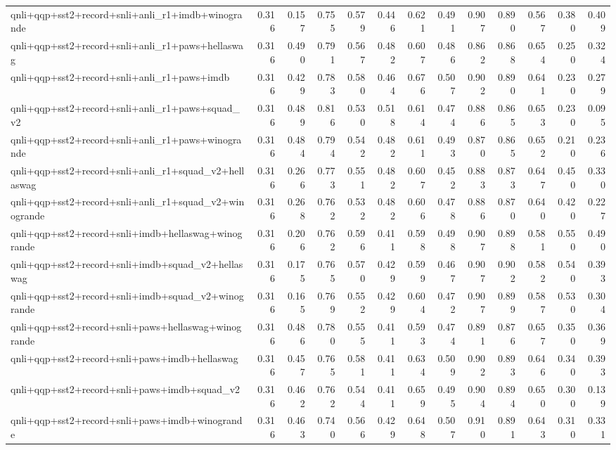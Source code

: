 \begin{table}[t]
\begin{tabular}{lrrrrrrrrrrrr}
    qnli+qqp+sst2+record+snli+anli\_r1+imdb+winogrande & 0.316 & 0.157 & 0.755 & 0.579 & 0.446 & 0.621 & 0.491 & 0.907 & 0.890 & 0.567 & 0.380 & 0.409 \\
    qnli+qqp+sst2+record+snli+anli\_r1+paws+hellaswag & 0.316 & 0.490 & 0.791 & 0.567 & 0.482 & 0.607 & 0.486 & 0.862 & 0.868 & 0.654 & 0.250 & 0.324 \\
    qnli+qqp+sst2+record+snli+anli\_r1+paws+imdb & 0.316 & 0.429 & 0.783 & 0.580 & 0.464 & 0.676 & 0.507 & 0.902 & 0.890 & 0.641 & 0.230 & 0.279 \\
    qnli+qqp+sst2+record+snli+anli\_r1+paws+squad\_v2 & 0.316 & 0.489 & 0.816 & 0.530 & 0.518 & 0.614 & 0.474 & 0.886 & 0.865 & 0.653 & 0.230 & 0.095 \\
    qnli+qqp+sst2+record+snli+anli\_r1+paws+winogrande & 0.316 & 0.484 & 0.794 & 0.542 & 0.482 & 0.611 & 0.493 & 0.870 & 0.865 & 0.652 & 0.210 & 0.236 \\
    qnli+qqp+sst2+record+snli+anli\_r1+squad\_v2+hellaswag & 0.316 & 0.266 & 0.773 & 0.551 & 0.482 & 0.607 & 0.452 & 0.883 & 0.873 & 0.647 & 0.450 & 0.330 \\
    qnli+qqp+sst2+record+snli+anli\_r1+squad\_v2+winogrande & 0.316 & 0.268 & 0.762 & 0.532 & 0.482 & 0.606 & 0.478 & 0.886 & 0.870 & 0.640 & 0.420 & 0.227 \\
    qnli+qqp+sst2+record+snli+imdb+hellaswag+winogrande & 0.316 & 0.206 & 0.762 & 0.596 & 0.411 & 0.598 & 0.498 & 0.907 & 0.898 & 0.581 & 0.550 & 0.490 \\
    qnli+qqp+sst2+record+snli+imdb+squad\_v2+hellaswag & 0.316 & 0.175 & 0.765 & 0.570 & 0.429 & 0.599 & 0.467 & 0.907 & 0.902 & 0.582 & 0.540 & 0.393 \\
    qnli+qqp+sst2+record+snli+imdb+squad\_v2+winogrande & 0.316 & 0.165 & 0.769 & 0.552 & 0.429 & 0.604 & 0.472 & 0.907 & 0.899 & 0.587 & 0.530 & 0.304 \\
    qnli+qqp+sst2+record+snli+paws+hellaswag+winogrande & 0.316 & 0.486 & 0.780 & 0.555 & 0.411 & 0.593 & 0.474 & 0.891 & 0.876 & 0.657 & 0.350 & 0.369 \\
    qnli+qqp+sst2+record+snli+paws+imdb+hellaswag & 0.316 & 0.457 & 0.765 & 0.581 & 0.411 & 0.634 & 0.509 & 0.902 & 0.893 & 0.646 & 0.340 & 0.393 \\
    qnli+qqp+sst2+record+snli+paws+imdb+squad\_v2 & 0.316 & 0.462 & 0.762 & 0.544 & 0.411 & 0.659 & 0.495 & 0.904 & 0.894 & 0.650 & 0.300 & 0.139 \\
    qnli+qqp+sst2+record+snli+paws+imdb+winogrande & 0.316 & 0.463 & 0.740 & 0.566 & 0.429 & 0.648 & 0.507 & 0.910 & 0.891 & 0.643 & 0.310 & 0.331 \\

\end{tabular}
\end{table}
